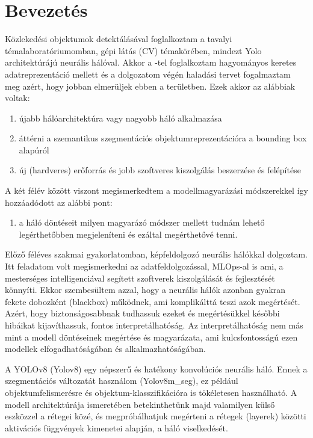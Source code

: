 \documentclass[12pt,oneside,a4paper]{article}
\title{\titletext}
\author{Nyilas Péter, Konzulensek: Dr Hullám Gábor}
\date{\today}
\newcommand{\newsection}[1]{\clearpage\section{#1}}\label{makro}
\theoremstyle{remark}
\begin{document}
	
	\maketitle
	\newpage
	\tableofcontents\label{ossz:tartalomjegyzek}
	\newpage
	\newsection{Bevezetés}\label{sec:bevezetes}
	\pagestyle{fancy}
	Közlekedési objektumok detektálásával foglalkoztam a tavalyi témalaboratóriumomban,
	gépi látás (\ac{CV}) témakörében, mindezt Yolo architektúrájú neurális hálóval.
	Akkor a -tel foglalkoztam hagyományos keretes adatreprezentáció mellett és a dolgozatom végén
	haladási tervet fogalmaztam meg azért, hogy jobban elmerüljek ebben a területben.
	Ezek akkor az alábbiak voltak:
	\begin{enumerate}[label=\alph*., start=1]\label{enum:tervek}
		\item újabb hálóarchitektúra vagy nagyobb háló alkalmazása
		\item áttérni a szemantikus szegmentációs objektumreprezentációra a bounding box alapúról
		\item új (hardveres) erőforrás és jobb szoftveres kiszolgálás beszerzése és felépítése
	\end{enumerate}
	A két félév között viszont megismerkedtem a modellmagyarázási módszerekkel így hozzáadódott az alábbi pont:
	\begin{enumerate}[label=\alph*., start=4]
		\item a háló döntéseit milyen magyarázó módszer mellett tudnám lehető legérthetőbben megjeleníteni és ezáltal megérthetővé tenni.
	\end{enumerate}
	
	Előző féléves szakmai gyakorlatomban, képfeldolgozó neurális hálókkal dolgoztam.
	Itt feladatom volt megismerkedni az adatfeldolgozással, MLOps-al is ami, a mesterséges intelligenciával segített szoftverek kiszolgálását
	és fejlesztését könnyíti.
	Ekkor szembesültem azzal, hogy a neurális hálók azonban gyakran fekete dobozként (blackbox) működnek,
	ami komplikálttá teszi azok megértését.
	Azért, hogy biztonságosabbnak tudhassuk ezeket
	és megértésükkel későbbi hibáikat kijavíthassuk, fontos interpretálhatóság.
	Az interpretálhatóság nem más mint a modell döntéseinek megértése
	és magyarázata, ami kulcsfontosságú ezen modellek elfogadhatóságában és alkalmazhatóságában.
	
	A YOLOv8 (\gls{Yolov8}) egy népszerű és hatékony konvolúciós neurális háló.
	Ennek a szegmentációs változatát használom (Yolov8m\_seg), ez
	például objektumfelismerésre és objektum-klasszifikációra is tökéletesen használható.
	A modell architektúrája ismeretében betekinthetünk majd valamilyen külső eszközzel a rétegei közé,
	és megpróbálhatjuk megérteni a rétegek (layerek) közötti aktivációs függvények kimenetei alapján, a háló viselkedését.
	
\end{document}
